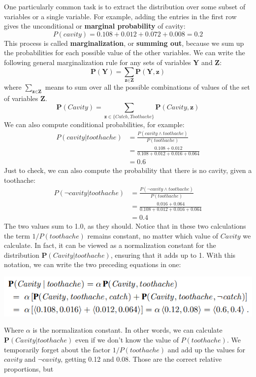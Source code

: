 One particularly common task is to extract the distribution over some subset of variables or a single variable. For example, adding the entries in the first row gives the unconditional or \textbf{marginal probability} of cavity:
\[P(cavity) = 0.108 + 0.012 + 0.072 + 0.008 = 0.2\]
This process is called \textbf{marginalization}, or \textbf{summing out}, because we sum up the probabilities for each possible value of the other variables. We can write the following general marginalization rule for any sets of variables $\textbf{Y}$ and $\textbf{Z}$:
\[\textbf{P}(\textbf{Y}) = \sum_{\textbf{z} \in \textbf{Z}}\textbf{P}(\textbf{Y}, \textbf{z})\]
where $\sum_{\textbf{z} \in \textbf{Z}}$ means to sum over all the possible combinations of values of the set of variables $\textbf{Z}$.
\[\textbf{P}(Cavity) = \sum_{\textbf{z} \in \{Catch, Toothache\}} \textbf{P}(Cavity, \textbf{z})\]
We can also compute conditional probabilities, for example:
\[
\begin{split}
    P(cavity | toothache) & = \frac{P(cavity \land toothache)}{P(toothache)}\\
    & = \frac{0.108 + 0.012}{0.108 + 0.012 + 0.016 + 0.064}\\
    & = 0.6
\end{split}
\]
Just to check, we can also compute the probability that there is no cavity, given a toothache:
\[
\begin{split}
    P(\neg cavity | toothache) & = \frac{P(\neg cavity \land toothache)}{P(toothache)}\\
    & = \frac{0.016 + 0.064}{0.108 + 0.012 + 0.016 + 0.064}\\
    & = 0.4
\end{split}
\]
The two values sum to 1.0, as they should. Notice that in these two calculations the term $1/P(toothache )$ remains constant, no matter which value of $Cavity$ we calculate. In fact, it can be viewed as a normalization constant for the distribution $\textbf{P}(Cavity |toothache)$, ensuring that it adds up to 1. With this notation, we can write the two preceding equations in one:
\begin{center}
    \includegraphics[]{images/prob-inference-rule.png}
\end{center}
Where $\alpha$ is the normalization constant. In other words, we can calculate $\textbf{P}(Cavity |toothache)$ even if we don’t know the value of $P(toothache)$. We temporarily forget about the factor $1/P(toothache )$ and add up the values for $cavity$ and $\neg cavity$, getting 0.12 and 0.08. Those are the correct relative proportions, but
